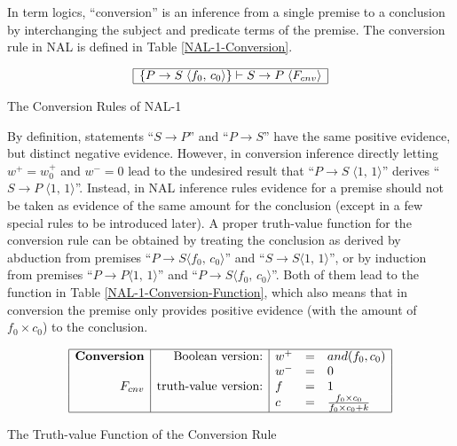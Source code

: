 In term logics, ``conversion'' is an inference from a single premise to a conclusion by interchanging the subject and predicate terms of the premise.  The conversion rule in NAL is defined in Table \ref{NAL-1-Conversion}.
\begin{table}[htb]
\[\begin{array}{|c|}
\hline
\{P \rightarrow S \; \langle f_0, \, c_0\rangle \} \vdash S \rightarrow P \; \langle F_{cnv}\rangle \\
\hline
\end{array}\]
\caption{The Conversion Rules of NAL-1}
\label{NAL-1-Conversion}
\end{table}

By definition, statements ``\(S \rightarrow P\)'' and ``\(P \rightarrow S\)'' have the same positive evidence, but distinct negative evidence. However, in conversion inference directly letting \(w^+ = w^+_0\) and \(w^- = 0\) lead to the undesired result that ``\(P \rightarrow S \; \langle 1, \, 1\rangle \)'' derives ``\(S \rightarrow P \; \langle 1, \, 1\rangle \)''.  Instead, in NAL inference rules evidence for a premise should not be taken as evidence of the same amount for the conclusion (except in a few special rules to be introduced later).  A proper truth-value function for the conversion rule can be obtained by treating the conclusion as derived by abduction from premises ``\(P \rightarrow S \langle  f_0, \, c_0 \rangle \)'' and ``\(S \rightarrow S \langle 1, \, 1 \rangle \)'', or by induction from premises ``\(P \rightarrow P \langle 1, \, 1\rangle \)'' and ``\(P \rightarrow S \langle f_0, \, c_0 \rangle \)''. Both of them lead to the function in Table \ref{NAL-1-Conversion-Function}, which also means that in conversion the premise only provides positive evidence (with the amount of \(f_0 \times c_0\)) to the conclusion.
\begin{table}[htb]
\[\begin{array}{|r|r|lcl|} \hline
\mbox{\textbf{Conversion}} & \mbox{Boolean version:}     & w^+ & = & and(f_0, c_0) \\
								           &					                   & w^- & = & 0 \\
                   F_{cnv} & \mbox{truth-value version:} & f & = & 1 \\
								           &					                   & c & = & \frac{f_0 \times c_0}{f_0 \times c_0 + k}\\
\hline \end{array}\]
\caption{The Truth-value Function of the Conversion Rule}
\label{NAL-1-Conversion-Function}
\end{table}


